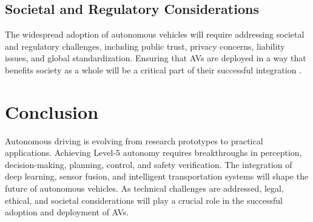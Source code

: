 \documentclass[12pt,a4paper]{article}
\begin{document}
\subsection{Societal and Regulatory Considerations}
The widespread adoption of autonomous vehicles will require addressing societal and regulatory challenges, including public trust, privacy concerns, liability issues, and global standardization. Ensuring that AVs are deployed in a way that benefits society as a whole will be a critical part of their successful integration \cite{zhang2023public}.

\section{Conclusion}
Autonomous driving is evolving from research prototypes to practical applications. Achieving Level-5 autonomy requires breakthroughs in perception, decision-making, planning, control, and safety verification. The integration of deep learning, sensor fusion, and intelligent transportation systems will shape the future of autonomous vehicles. As technical challenges are addressed, legal, ethical, and societal considerations will play a crucial role in the successful adoption and deployment of AVs.
\end{document}
